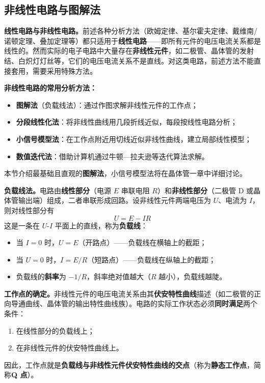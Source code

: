 \documentclass[12pt,UTF8]{ctexbook}
\begin{document}
\subsection{非线性电路与图解法}

\textbf{线性电路与非线性电路。}前述各种分析方法（欧姆定律、基尔霍夫定律、戴维南/诺顿定理、叠加定理等）都只适用于\textbf{线性电路}——即所有元件的电压电流关系都是线性的。然而实际的电子电路中大量存在\textbf{非线性元件}，如二极管、晶体管的发射结、白炽灯灯丝等，它们的电压电流关系不是直线。对这类电路，前述方法不能直接套用，需要采用特殊方法。

\textbf{非线性电路的常用分析方法：}
\begin{itemize}
  \item \textbf{图解法}（负载线法）：通过作图求解非线性元件的工作点；
  \item \textbf{分段线性化法}：将非线性曲线用几段折线近似，每段按线性电路分析；
  \item \textbf{小信号模型法}：在工作点附近用切线近似非线性曲线，建立局部线性模型；
  \item \textbf{数值迭代法}：借助计算机通过牛顿—拉夫逊等迭代算法求解。
\end{itemize}
本节介绍最基础且直观的\textbf{图解法}，小信号模型法将在晶体管一章中详细讨论。

\textbf{负载线法。}电路由\textbf{线性部分}（电源 $E$ 串联电阻 $R$）和\textbf{非线性部分}（二极管 D 或晶体管输出端）组成，二者串联形成回路。设非线性元件两端电压为 $U$、电流为 $I$，则对线性部分有
\[
U = E - I R
\]
这是一条在 $U$-$I$ 平面上的直线，称为\textbf{负载线}：
\begin{itemize}
  \item 当 $I = 0$ 时，$U = E$（开路点）——负载线在横轴上的截距；
  \item 当 $U = 0$ 时，$I = E/R$（短路点）——负载线在纵轴上的截距；
  \item 负载线的\textbf{斜率}为 $-1/R$，斜率绝对值越大（$R$ 越小），负载线越陡。
\end{itemize}


\textbf{工作点的确定。}非线性元件的电压电流关系由其\textbf{伏安特性曲线}描述（如二极管的正向导通曲线、晶体管的输出特性曲线族）。电路的实际工作状态必须\textbf{同时满足}两个条件：
\begin{enumerate}
  \item 在线性部分的负载线上；
  \item 在非线性元件的伏安特性曲线上。
\end{enumerate}
因此，工作点就是\textbf{负载线与非线性元件伏安特性曲线的交点}（称为\textbf{静态工作点}，简称\textbf{Q 点}）。
\end{document}
